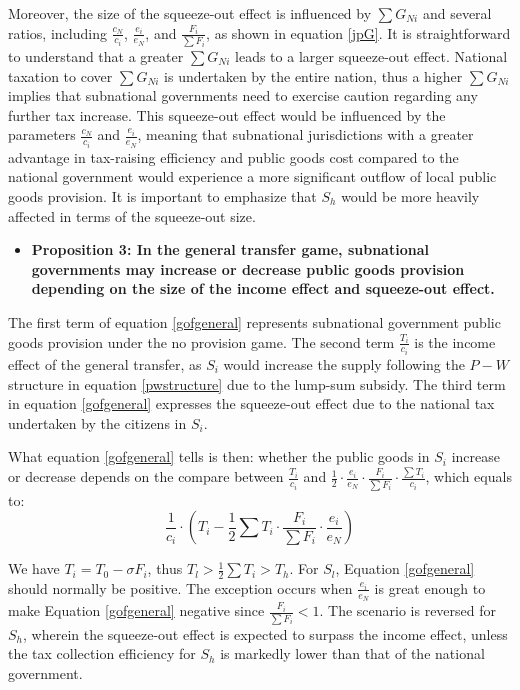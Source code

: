 Moreover, the size of the squeeze-out effect is influenced by $\sum G_{Ni}$ and several ratios, including $\frac{c_N}{c_i}$, $\frac{e_i}{e_N}$, and $\frac{F_i}{\sum F_i}$, as shown in equation \ref{jpG}. It is straightforward to understand that a greater $\sum G_{Ni}$ leads to a larger squeeze-out effect. National taxation to cover $\sum G_{Ni}$ is undertaken by the entire nation, thus a higher $\sum G_{Ni}$ implies that subnational governments need to exercise caution regarding any further tax increase. This squeeze-out effect would be influenced by the parameters $\frac{c_N}{c_i}$ and $\frac{e_i}{e_N}$, meaning that subnational jurisdictions with a greater advantage in tax-raising efficiency and public goods cost compared to the national government would experience a more significant outflow of local public goods provision. It is important to emphasize that $S_h$ would be more heavily affected in terms of the squeeze-out size.

\begin{itemize}
    \item \textbf{Proposition 3: In the general transfer game, subnational governments may increase or decrease public goods provision depending on the size of the income effect and squeeze-out effect.}
\end{itemize}
The first term of equation \ref{gofgeneral} represents subnational government public goods provision under the no provision game. The second term $\frac{T_i}{c_i}$ is the income effect of the general transfer, as $S_i$ would increase the supply following the $P-W$ structure in equation \ref{pwstructure} due to the lump-sum subsidy. The third term in equation \ref{gofgeneral} expresses the squeeze-out effect due to the national tax undertaken by the citizens in $S_i$.

What equation \ref{gofgeneral} tells is then: whether the public goods in $S_i$ increase or decrease depends on the compare between $\frac{T_i}{c_i}$ and $\frac{1}{2} \cdot \frac{e_i}{e_N}\cdot \frac{F_i}{\sum F_i} \cdot \frac{\sum T_i}{c_i}$, which equals to:
\begin{equation}
    \frac{1}{c_i}\cdot (T_i-\frac{1}{2}\sum T_i\cdot \frac{F_i}{\sum F_i}\cdot \frac{e_i}{e_N})
\end{equation}


We have $T_i=T_0 - \sigma F_i$, thus $T_l>\frac{1}{2}\sum T_i >T_h$. For $S_l$, Equation \ref{gofgeneral} should normally be positive. The exception occurs when $\frac{e_i}{e_N}$ is great enough to make Equation \ref{gofgeneral} negative since $\frac{F_i}{\sum F_i}<1$. The scenario is reversed for $S_h$, wherein the squeeze-out effect is expected to surpass the income effect, unless the tax collection efficiency for $S_h$ is markedly lower than that of the national government. %

